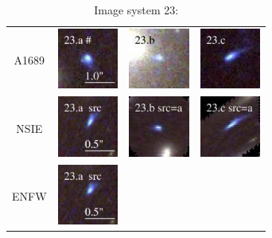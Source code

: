 \documentclass[useAMS,usenatbib]{mn2e}
\begin{document}
\begin{table}
  \caption{Image system 23:}\vspace{0mm}
  \begin{tabular}{cccc}
    \multicolumn{1}{m{1cm}}{{\Large A1689}}
    & \multicolumn{1}{m{1.7cm}}{\includegraphics[height=2.00cm,clip]{figs/nsie_img/rgb.img_23_a.ps}}
    & \multicolumn{1}{m{1.7cm}}{\includegraphics[height=2.00cm,clip]{figs/nsie_img/rgb.img_23_b.ps}}
    & \multicolumn{1}{m{1.7cm}}{\includegraphics[height=2.00cm,clip]{figs/nsie_img/rgb.img_23_c.ps}} \\
    \multicolumn{1}{m{1cm}}{{\Large NSIE}}
    & \multicolumn{1}{m{1.7cm}}{\includegraphics[height=2.00cm,clip]{figs/nsie_img/rgb.src_23_a.ps}}
    & \multicolumn{1}{m{1.7cm}}{\includegraphics[height=2.00cm,clip]{figs/nsie_img/rgb.pre_23_b_a_tri.ps}}
    & \multicolumn{1}{m{1.7cm}}{\includegraphics[height=2.00cm,clip]{figs/nsie_img/rgb.pre_23_c_a_tri.ps}} \\
    \multicolumn{1}{m{1cm}}{{\Large ENFW}}
    & \multicolumn{1}{m{1.7cm}}{\includegraphics[height=2.00cm,clip]{figs/enfw_img/rgb.src_23_a.ps}}

\end{tabular}
\end{table}
\end{document}
